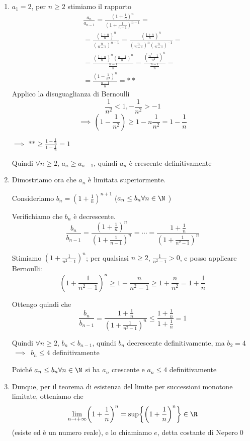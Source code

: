 \begin{enumerate}
    \item $ a_{1} = 2  $, per $ n\ge 2 $ stimiamo il rapporto
    \begin{multline*}
        \frac{a_{n}}{a_{n-1}}=\frac{(1+\frac{1}{n})^n}{(1+\frac{1}{n-1})^{n-1}}=\\
        =\frac{(\frac{1+n}{n})^n}{(\frac{n}{n-1})^{n-1}}=\frac{(\frac{1+n}{n})^n}{(\frac{n}{n-1})^{n}(\frac{n}{n-1})^{-1}}=\\
        =\frac{(\frac{1+n}{n})^n(\frac{n-1}{n})^n}{\frac{n-1}{n}}=\frac{(\frac{n^2-1}{n^2})^n}{\frac{n-1}{n}}=\\
        =\frac{(1-\frac{1}{n^2})^n}{\frac{n-1}{n}}=**
    \end{multline*}
    Applico la disuguaglianza di Bernoulli
    \[
        \frac{1}{n^2}<1, -\frac{1}{n^2}>-1
    \]
    \[
    \implies\,(1-\frac{1}{n^2})\ge 1-n\frac{1}{n^2}=1-\frac{1}{n}
    \] 

    $\implies$ $ **\ge \frac{1-\frac{1}{n}}{1-\frac{1}{n}}=1 $

    Quindi $ \forall n\ge 2 $, $ a_{n} \ge a_{n-1}   $, quindi $ a_{n} $ è crescente definitivamente
    \item Dimostriamo ora che $ a_{n}  $ è limitata superiormente.
    
    Consideriamo $ b_{n} = (1+\frac{1}{n})^{n+1} $ ($a_{n}\le b_{n} \forall n \in \N$ )

    Verifichiamo che $ b_{n} $ è decrescente.
    \[
        \frac{b_{n} }{b_{n-1}}=\frac{(1+\frac{1}{n})^n}{(1+\frac{1}{n-1})^n}=
        \cdots
        =\frac{1+\frac{1}{n}}{(1+\frac{1}{n^2-1})^n}
    \]

    Stimiamo $ (1+\frac{1}{n^2-1})^n $; per qualsiasi $ n\ge 2 $, $ \frac{1}{n^2-1}>0 $, e posso applicare Bernoulli:
    \[
        (1+\frac{1}{n^2-1})^n\ge 1 - \frac{n}{n^2-1}\ge 1+\frac{n}{n^2}=1+\frac{1}{n}
    \]

    Ottengo quindi che
    \[
        \frac{b_{n} }{b_{n-1}}=\frac{1+\frac{1}{n}}{(1+\frac{1}{n^2-1})^n}\le \frac{1+\frac{1}{n}}{1+\frac{1}{n}}=1
    \]

    Quindi $ \forall n\ge 2 $, $ b_{n} <b_{n-1}  $, quindi $ b_{n} $ decrescente definitivamente, ma $ b_{2} = 4 $ $ \,\implies\,$ $ b_{n} \le 4 $ definitivamente

    Poiché $a_{n}\le b_{n} \forall n \in \N$ si ha $ a_{n}  $ crescente e $ a_{n} \le 4 $ definitivamente

    \item Dunque, per il teorema di esistenza del limite per successioni monotone limitate, otteniamo che
    \[
      \lim_{n\to + \infty} \biggl(1+\frac{1}{n}\biggr)^n = \sup\biggl\{\biggl(1+\frac{1}{n}\biggr)^n\biggr\} \in \R
    \]
    (esiste ed è un numero reale), e lo chiamiamo $ e $, detta costante di Nepero\qed
\end{enumerate}

